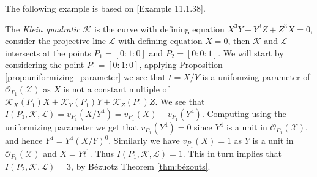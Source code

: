 The following example is based on \cite{CCC_with_CA}[Example 11.1.38].
\begin{example}\label{exmp:klein_quadratic}
  The \textit{Klein quadratic} $\mathcal{K}$ is the curve with defining equation $X^{3}Y + Y^{3}Z + Z^{3}X = 0$, consider the projective line $\mathcal{L}$ with defining equation $X = 0$, then $\mathcal{K}$ and $\mathcal{L}$ intersects at the points $P_{1} = [0 : 1 : 0]$ and $P_{2} = [0 : 0 : 1]$. We will start by considering the point $P_{1} = [0 : 1 : 0]$, applying Proposition \ref{prop:uniformizing_parameter} we see that $t = X / Y$ is a unifomzing parameter of $\mathcal{O}_{P_{1}}(\mathcal{X})$ as $X$ is not a constant multiple of $\mathcal{K}_X(P_{1})X + \mathcal{K}_Y(P_{1})Y + \mathcal{K}_Z(P_1)Z$. We see that $I(P_{1}, \mathcal{K}, \mathcal{L}) = v_{P_{1}}(X / Y^{4}) = v_{P_{1}}(X) - v_{P_{1}}(Y^{4})$.
  Computing using the uniformizing parameter we get that $v_{P_{1}}(Y^{4}) = 0$ since $Y^{4}$ is a unit in $\mathcal{O}_{P_{1}}(\mathcal{X})$, and hence $Y^{4} = Y^{4}(X / Y)^{0}$. Similarly we have $v_{P_{1}}(X) = 1$ as $Y$ is a unit in $\mathcal{O}_{P_1}(\mathcal{X})$ and $X = Y t^{1}$. Thus $I(P_{1}, \mathcal{K}, \mathcal{L}) = 1$. This in turn implies that $I(P_{2}, \mathcal{K}, \mathcal{L}) = 3$, by Bézuotz Theorem \ref{thm:bézouts}.
\end{example}
